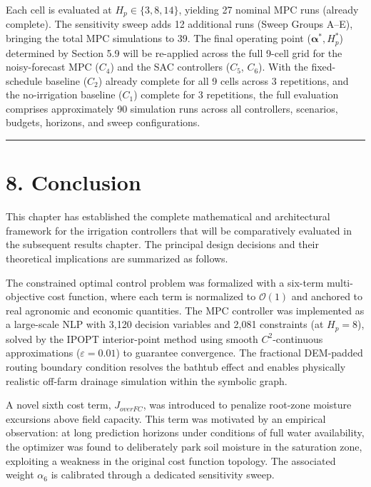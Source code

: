 Each cell is evaluated at \(H_p \in \{3, 8, 14\}\), yielding 27 nominal
MPC runs (already complete). The sensitivity sweep adds 12 additional
runs (Sweep Groups A--E), bringing the total MPC simulations to 39. The
final operating point (\(\boldsymbol{\alpha}^*, H_p^*\)) determined by
Section 5.9 will be re-applied across the full 9-cell grid for the
noisy-forecast MPC (\(C_4\)) and the SAC controllers (\(C_5\), \(C_6\)).
With the fixed-schedule baseline (\(C_2\)) already complete for all 9
cells across 3 repetitions, and the no-irrigation baseline (\(C_1\))
complete for 3 repetitions, the full evaluation comprises approximately
90 simulation runs across all controllers, scenarios, budgets, horizons,
and sweep configurations.

\begin{center}\rule{0.5\linewidth}{0.5pt}\end{center}

\section{8. Conclusion}\label{conclusion}

This chapter has established the complete mathematical and architectural
framework for the irrigation controllers that will be comparatively
evaluated in the subsequent results chapter. The principal design
decisions and their theoretical implications are summarized as follows.

The constrained optimal control problem was formalized with a six-term
multi-objective cost function, where each term is normalized to
\(\mathcal{O}(1)\) and anchored to real agronomic and economic
quantities. The MPC controller was implemented as a large-scale NLP with
3,120 decision variables and 2,081 constraints (at \(H_p = 8\)), solved
by the IPOPT interior-point method using smooth \(C^2\)-continuous
approximations (\(\varepsilon = 0.01\)) to guarantee convergence. The
fractional DEM-padded routing boundary condition resolves the bathtub
effect and enables physically realistic off-farm drainage simulation
within the symbolic graph.

A novel sixth cost term, \(J_{overFC}\), was introduced to penalize
root-zone moisture excursions above field capacity. This term was
motivated by an empirical observation: at long prediction horizons under
conditions of full water availability, the optimizer was found to
deliberately park soil moisture in the saturation zone, exploiting a
weakness in the original cost function topology. The associated weight
\(\alpha_6\) is calibrated through a dedicated sensitivity sweep.

